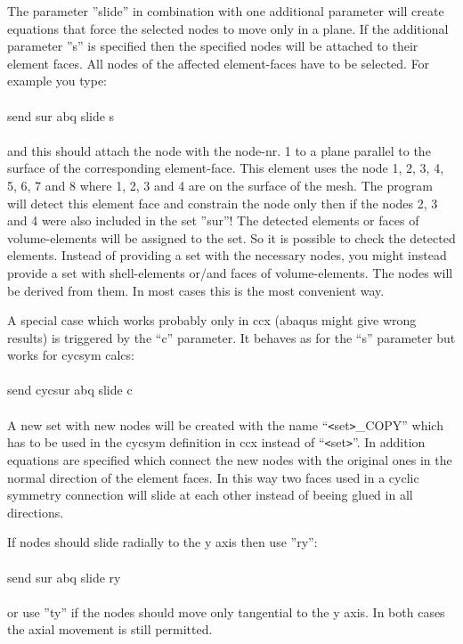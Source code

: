 \documentclass{article}
\begin{document}
The parameter ''slide'' in combination with one additional parameter will create equations that force the selected nodes to move only in a plane. If the additional parameter ''s'' is specified then the specified nodes will be attached to their element faces. All nodes of the affected element-faces have to be selected. For example you type:\\\\send sur abq slide s\\\\and this should attach the node with the node-nr. 1 to a plane parallel to the surface of the corresponding element-face. This element uses the node 1, 2, 3, 4, 5, 6, 7 and 8 where 1, 2, 3 and 4 are on the surface of the mesh. The program will detect this element face and constrain the node only then if the nodes 2, 3 and 4 were also included in the set ''sur''! The detected elements or faces of volume-elements will be assigned to the set. So it is possible to check the detected elements. Instead of providing a set with the necessary nodes, you might instead provide a set with shell-elements or/and faces of volume-elements. The nodes will be derived from them. In most cases this is the most convenient way.

A special case which works probably only in ccx (abaqus might give wrong results) is triggered by the ``c'' parameter. It behaves as for the ``s'' parameter but works for cycsym calcs:\\\\send cycsur abq slide c\\\\ A new set with new nodes will be created with the name ``\verb_<_set\verb_>_\_COPY'' which has to be used in the cycsym definition in ccx instead of ``\verb_<_set\verb_>_''. In addition equations are specified which connect the new nodes with the original ones in the normal direction of the element faces. In this way two faces used in a cyclic symmetry connection will slide at each other instead of beeing glued in all directions. 

If nodes should slide radially to the y axis then use ''ry'':\\\\send sur abq slide ry\\\\ or use ''ty'' if the nodes should move only tangential to the y axis. In both cases the axial movement is still permitted.
\end{document}
